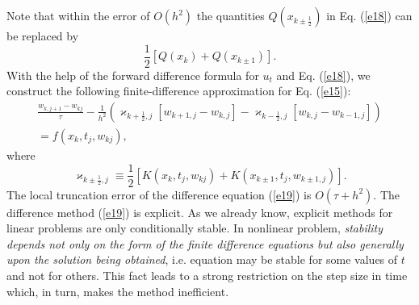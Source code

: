 \vskip 3mm
 
Note that within the error of $O(h^2)$ the quantities
$Q(x_{k\pm\frac{1}{2}})$ in Eq. (\ref{e18}) can be replaced by
\[
\frac{1}{2}\left[Q(x_{k})+Q(x_{k\pm 1})\right].
\]
With the help of the forward difference formula for $u_{t}$ and Eq. (\ref{e18}), we construct the following
finite-difference approximation for Eq. (\ref{e15}):
\begin{multline}
\frac{w_{k,j+1}-w_{kj}}{\tau}-
\frac{1}{h^2}
\left(\varkappa_{k+\frac{1}{2},j}\left[w_{k+1,j}-w_{k,j}\right]-
\varkappa_{k-\frac{1}{2},j}\left[w_{k,j}-w_{k-1,j}\right]\right)\\=
f(x_{k},t_{j},w_{kj}),\label{e19}
\end{multline}
where
\[
\varkappa_{k\pm\frac{1}{2},j}\equiv \frac{1}{2}\left[K(x_{k},t_{j},w_{kj})+
K(x_{k\pm 1},t_{j},w_{k\pm 1,j})\right].
\]
The local truncation error of the difference equation (\ref{e19})
is $O(\tau+h^2)$. The difference method (\ref{e19}) is explicit.
As we already know, explicit methods for linear problems are only
conditionally stable. In nonlinear problem, {\it stability depends
not only on the form of the finite difference equations but also generally
upon the solution being obtained}, i.e.
equation may be stable for some values of $t$ and not for others. This fact
leads to a strong restriction on the step size in time which, in turn, makes
the method inefficient.

\vskip 3mm
 
